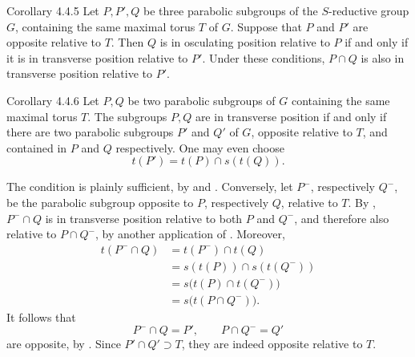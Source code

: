 \begin{sgastatement}{Corollary 4.4.5}
Let \(P,P',Q\) be three parabolic subgroups of the \(S\)-reductive
group \(G\), containing the same maximal torus \(T\) of \(G\).
Suppose that \(P\) and \(P'\) are opposite relative to \(T\).  Then
\(Q\) is in osculating position relative to \(P\) if and only if it is
in transverse position relative to \(P'\).  Under these conditions,
\(P\cap Q\) is also in transverse position relative to \(P'\).
\end{sgastatement}

\begin{sgastatement}{Corollary 4.4.6}
Let \(P,Q\) be two parabolic subgroups of \(G\) containing the same
maximal torus \(T\).  The subgroups \(P,Q\) are in transverse position
if and only if there are two parabolic subgroups \(P'\) and \(Q'\) of
\(G\), opposite relative to \(T\), and contained in \(P\) and \(Q\)
respectively.  One may even choose
\[
 t(P')=t(P)\cap s(t(Q)).
\]
\end{sgastatement}

The condition is plainly sufficient, by \textup{} and
\textup{}.  Conversely, let \(P^-\), respectively \(Q^-\),
be the parabolic subgroup opposite to \(P\), respectively \(Q\),
relative to \(T\).  By , \(P^-\cap Q\) is in transverse position
relative to both \(P\) and \(Q^-\), and therefore also relative to
\(P\cap Q^-\), by another application of .  Moreover,
\[
\begin{aligned}
 t(P^-\cap Q)
 &=t(P^-)\cap t(Q)\\
 &=s(t(P))\cap s(t(Q^-))\\
 &=s\bigl(t(P)\cap t(Q^-)\bigr)\\
 &=s\bigl(t(P\cap Q^-)\bigr).
\end{aligned}
\]
It follows that
\[
 P^-\cap Q=P',\qquad P\cap Q^-=Q'
\]
are opposite, by \textup{}.  Since \(P'\cap Q'\supset T\),
they are indeed opposite relative to \(T\).
